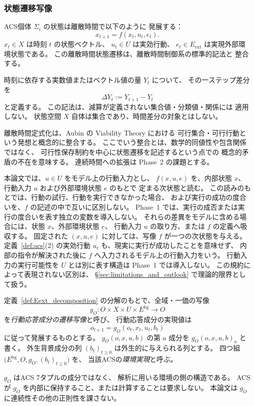\subsubsection{状態遷移写像}

\begin{definition}[状態遷移]
\label{def:state_transition}
ACS個体 $\Sigma_i$ の状態は離散時間で以下のように
発展する：
\[
  x_{t+1} = f(x_t, u_t, e_t).
\]
$x_t\in X$ は時刻 $t$ の状態ベクトル、
$u_t\in U$ は実効行動、
$e_t\in E_{\mathrm{ext}}$ は実現外部環境状態である。
この離散時間状態遷移は、離散時間制御系の標準的記法と
整合する\cite{Bertsekas2017}。

時刻に依存する実数値またはベクトル値の量 $Y_t$ について、
その一ステップ差分を
\[
  \Delta Y_t:=Y_{t+1}-Y_t
\]
と定義する。
この記法は、減算が定義されない集合値・分類値・関係には
適用しない。
状態空間 $X$ 自体は集合であり、時間差分の対象とはしない。

離散時間定式化は、Aubin の Viability Theory における
可行集合・可行行動という発想と概念的に整合する\cite{Aubin1991}。
ここでいう整合とは、数学的同値性や包含関係ではなく、
可行性保存制約を中心に状態遷移を記述するという点での
概念的矛盾の不在を意味する。
連続時間への拡張は Phase~2 の課題とする。
\end{definition}

\begin{remark}[状態遷移写像の読みの規約]
\label{rem:f_reading}
本論文では、$u\in U$ をモデル上の行動入力とし、
$f(x,u,e)$ を、内部状態 $x$、行動入力 $u$ および外部環境状態 $e$ のもとで
定まる次状態と読む。
この読みのもとでは、行動の試行、行動を実行できなかった場合、
および実行の成功の度合いを、$f$ の記述の中で互いに区別しない。
Phase~1 では、実行の成否または実行の度合いを表す独立の変数を導入しない。
それらの差異をモデルに含める場合には、状態 $x$、外部環境状態 $e$、
行動入力 $u$ の取り方、または $f$ の定義へ吸収する。
固定された $(x,u,e)$ に対しては、写像 $f$ が一つの次状態を与える。
定義~\ref{def:acs}(2) の実効行動 $u_t$ も、現実に実行が成功したことを意味せず、
内部の指令が解決された後に $f$ へ入力されるモデル上の行動入力をいう。
行動入力の実行可能性を $U$ とは別に表す構造は Phase~1 では導入しない。
この規約によって表現されない区別は、
\S\ref{sec:limitations_and_outlook} で理論的限界として扱う。
\end{remark}

\begin{definition}[行動応答成分の遷移写像と環境実現]
\label{def:env_realization}
定義~\ref{def:Eext_decomposition} の分解のもとで、全域・一価の写像
\[
  g_O:O\times X\times U\times E^{\mathrm{bg}}\longrightarrow O
\]
を\emph{行動応答成分の遷移写像}と呼び、
行動応答成分の実現値は
\[
  o_{t+1}=g_O(o_t,x_t,u_t,b_t)
\]
に従って発展するものとする。
$g_O(o,x,u,b)$ の第 $a$ 成分を $g_O(o,x,u,b)_a$ と書く。
外生背景成分の列 $(b_t)_{t\geq0}$ は外生的に与えられる列とする。
四つ組 $\bigl(E^{\mathrm{bg}},O,g_O,(b_t)_{t\geq0}\bigr)$ を、
当該ACSの\emph{環境実現}と呼ぶ。

$g_O$ はACS 7タプルの成分ではなく、
解析に用いる環境の側の構造である。
ACSが $g_O$ を内部に保持すること、または計算することは要求しない。
本論文は $g_O$ に連続性その他の正則性を課さない。
\end{definition}

